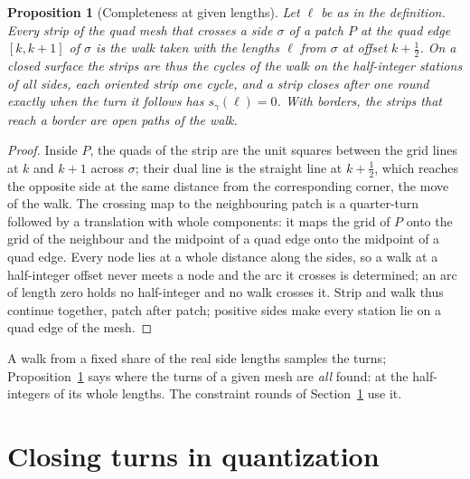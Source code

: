 \documentclass[11pt,a4paper]{article}
\newtheorem{proposition}{Proposition}
\newcommand{\shift}{s}
\newcommand{\lean}[1]{\texttt{\detokenize{#1}}}
\newenvironment{evidence}[3][]{}{}
\begin{document}
\begin{evidence}{core}{\lean{TMesh.completeness_tmesh}, from \lean{Completeness.completeness_at_given_lengths} and \lean{TMesh.closedGluing} (the gluing of the unit edges read off the T-mesh, one to one at balanced whole lengths), \lean{TMesh.walk_stations}, \lean{TMesh.arcAt_of_unit_edge}; assumed: that the cycles of the model are the strips of the mesh; the strips that reach a border are not formalized}
\begin{proposition}[Completeness at given lengths]\label{prop:complete}
Let $\ell$ be as in the definition. Every strip of the quad mesh that
crosses a side $\sigma$ of a patch $P$ at the quad edge $[k, k+1]$ of
$\sigma$ is the walk taken \emph{with the lengths $\ell$} from $\sigma$ at
offset $k + \tfrac12$. On a closed surface the strips are thus the cycles of
the walk on the half-integer stations of all sides, each oriented strip one
cycle, and a strip closes after one round exactly when the turn it follows
has $\shift_\gamma(\ell) = 0$. With borders, the strips that reach a border
are open paths of the walk.
\end{proposition}
\end{evidence}

\begin{proof}
Inside $P$, the quads of the strip are the unit squares between the grid
lines at $k$ and $k+1$ across $\sigma$; their dual line is the straight line
at $k + \tfrac12$, which reaches the opposite side at the same distance from
the corresponding corner, the move of the walk. The crossing map to the
neighbouring patch is a quarter-turn followed by a translation with whole
components: it maps the grid of $P$ onto the grid of the neighbour and the
midpoint of a quad edge onto the midpoint of a quad edge. Every node lies at
a whole distance along the sides, so a walk at a half-integer offset never
meets a node and the arc it crosses is determined; an arc of length zero
holds no half-integer and no walk crosses it. Strip and walk thus continue
together, patch after patch; positive sides make every station lie on a quad
edge of the mesh.
\end{proof}

A walk from a fixed share of the real side lengths samples the turns;
Proposition~\ref{prop:complete} says where the turns of a given mesh are
\emph{all} found: at the half-integers of its whole lengths. The constraint
rounds of Section~\ref{sec:closing} use it.

\section{Closing turns in quantization}\label{sec:closing}
\end{document}

